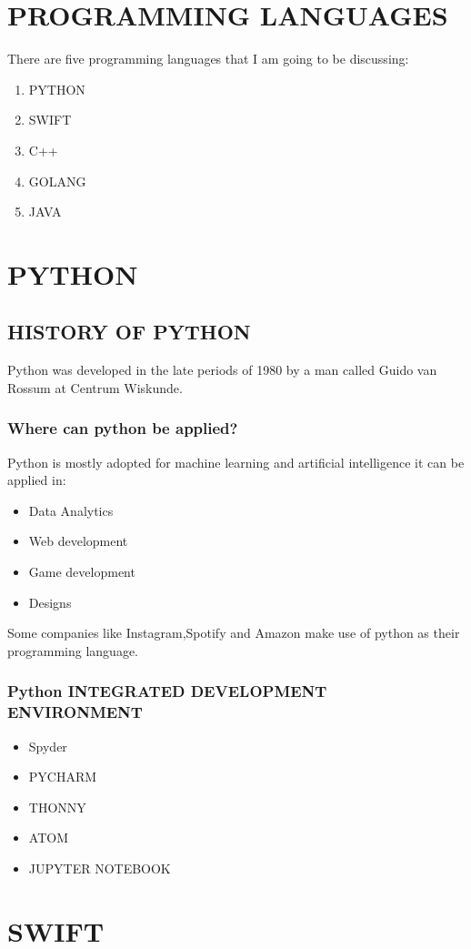 \documentclass{article}
\author{MBAEKWE UGOCHI}
\begin{document}
	\section{PROGRAMMING LANGUAGES}
	There are five programming languages that I am going to be discussing: 
	\begin{enumerate}
		\item PYTHON
		\item SWIFT
		\item C++
		\item GOLANG
		\item JAVA
	\end{enumerate}
\section{PYTHON}
\subsection{HISTORY OF PYTHON}
Python was developed in the late periods of 1980 by a man called Guido van Rossum  at Centrum Wiskunde.
\subsubsection{Where can python be applied?}
Python is mostly adopted for machine learning and artificial intelligence it can be applied in:
\begin{itemize}
	\item Data Analytics
	\item Web development
	\item Game development
	\item Designs
\end{itemize}
	Some companies like Instagram,Spotify and Amazon make use of python as their programming language. 
	\subsubsection{Python INTEGRATED DEVELOPMENT ENVIRONMENT}
	\begin{itemize}
		\item Spyder
		\item PYCHARM
		\item THONNY
		\item ATOM
		\item JUPYTER NOTEBOOK
	\end{itemize}	
\section{SWIFT}
\end{document}
